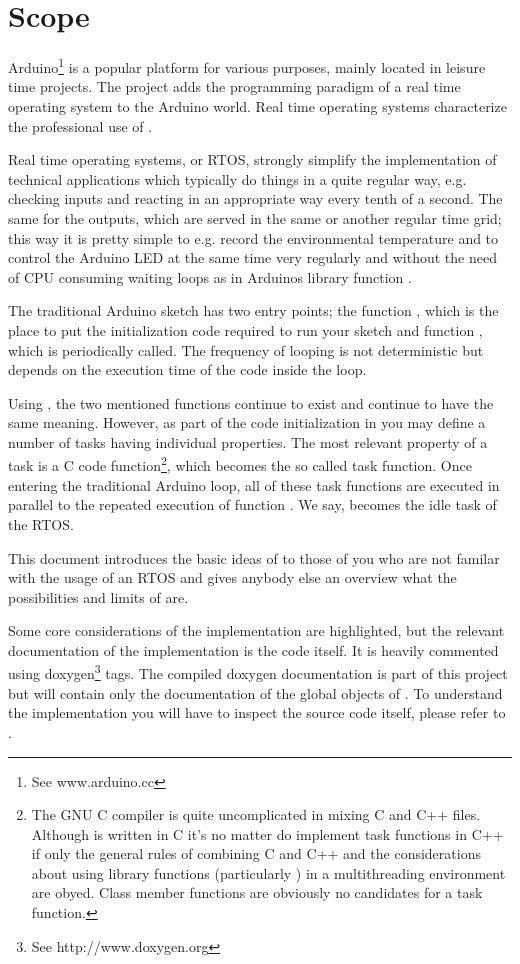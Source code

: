 \chapter{Scope}
\label{secScope}

Arduino\footnote{See www.arduino.cc} is a popular \uC{} platform for
various purposes, mainly located in leisure time projects. The \rtos{}
project adds the programming paradigm of a real time operating system to
the Arduino world. Real time operating systems characterize the
professional use of \uCs{}.

Real time operating systems, or RTOS, strongly simplify the implementation
of technical applications which typically do things in a quite regular
way, e.g. checking inputs and reacting in an appropriate way every tenth
of a second. The same for the outputs, which are served in the same or
another regular time grid; this way it is pretty simple to e.g. record the
environmental temperature and to control the Arduino LED at the same time
very regularly and without the need of CPU consuming waiting loops as
in Arduinos library function .

The traditional Arduino sketch has two entry points; the function
, which is the place to put the initialization code required
to run your sketch and function , which is periodically
called. The frequency of looping is not deterministic but depends on
the execution time of the code inside the loop.

Using \rtos{}, the two mentioned functions continue to exist and continue to
have the same meaning. However, as part of the code initialization in
 you may define a number of tasks having individual
properties. The most relevant property of a task is a C code
function\footnote{The GNU C compiler is quite uncomplicated in mixing C
and C++ files. Although \rtos{} is written in C it's no matter do implement
task functions in C++ if only the general rules of combining C and C++ and
the considerations about using library functions (particularly
) in a multithreading environment are obyed. Class member
functions are obviously no candidates for a task function.}, which becomes
the so called task function. Once entering the traditional Arduino loop,
all of these task functions are executed in parallel to the repeated
execution of function . We say,  becomes the idle
task of the RTOS.

This document introduces the basic ideas of \rtos{} to those of you who are
not familar with the usage of an RTOS and gives anybody else an overview
what the possibilities and limits of \rtos{} are.

Some core considerations of the implementation are highlighted, but the
relevant documentation of the implementation is the code itself. It is
heavily commented using doxygen\footnote{See http://www.doxygen.org} tags.
The compiled doxygen documentation is part of this project but will
contain only the documentation of the global objects of \rtos. To
understand the implementation you will have to inspect the source code
itself, please refer to .

